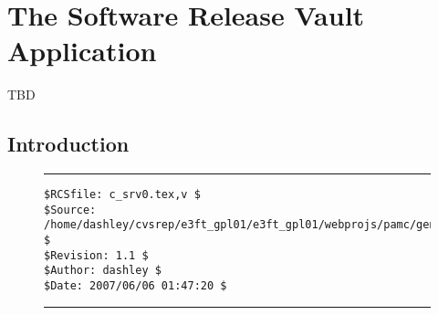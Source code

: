 
\chapter{The Software Release Vault Application}

\label{csrv0}

                  {TBD}


\section{Introduction}
\label{csrv0:sint0}


\noindent\begin{figure}[!b]
\noindent\rule[-0.25in]{\textwidth}{1pt}
\begin{tiny}
\begin{verbatim}
$RCSfile: c_srv0.tex,v $
$Source: /home/dashley/cvsrep/e3ft_gpl01/e3ft_gpl01/webprojs/pamc/gen_a/docs/manual/man_a/c_srv0/c_srv0.tex,v $
$Revision: 1.1 $
$Author: dashley $
$Date: 2007/06/06 01:47:20 $
\end{verbatim}
\end{tiny}
\noindent\rule[0.25in]{\textwidth}{1pt}
\end{figure}

%
